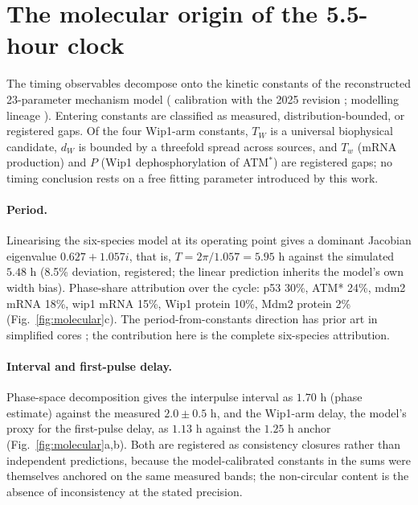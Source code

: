 \documentclass[11pt,a4paper]{article}
\begin{document}
\section{The molecular origin of the 5.5-hour clock}
\label{sec:molecular}

The timing observables decompose onto the kinetic constants of the reconstructed 23-parameter mechanism model (\cite{Monke2017} calibration with the 2025 revision \cite{Venkatachalapathy2025}; modelling lineage \cite{Monk2003,BarOr2000,Ciliberto2005,Chickarmane2007,NovakTyson2008}). Entering constants are classified as measured, distribution-bounded, or registered gaps. Of the four Wip1-arm constants, $T_W$ is a universal biophysical candidate, $d_W$ is bounded by a threefold spread across sources, and $T_w$ (mRNA production) and $P$ (Wip1 dephosphorylation of ATM$^*$) are registered gaps; no timing conclusion rests on a free fitting parameter introduced by this work.

\paragraph{Period.} Linearising the six-species model at its operating point gives a dominant Jacobian eigenvalue $0.627+1.057i$, that is, $T=2\pi/1.057=5.95$ h against the simulated $5.48$ h (8.5\% deviation, registered; the linear prediction inherits the model's own width bias). Phase-share attribution over the cycle: p53 30\%, ATM* 24\%, mdm2 mRNA 18\%, wip1 mRNA 15\%, Wip1 protein 10\%, Mdm2 protein 2\% (Fig.~\ref{fig:molecular}c). The period-from-constants direction has prior art in simplified cores \cite{Monk2003,Wang2019,Belgacem2026}; the contribution here is the complete six-species attribution.

\paragraph{Interval and first-pulse delay.} Phase-space decomposition gives the interpulse interval as $1.70$ h (phase estimate) against the measured $2.0\pm0.5$ h, and the Wip1-arm delay, the model's proxy for the first-pulse delay, as $1.13$ h against the $1.25$ h anchor (Fig.~\ref{fig:molecular}a,b). Both are registered as consistency closures rather than independent predictions, because the model-calibrated constants in the sums were themselves anchored on the same measured bands; the non-circular content is the absence of inconsistency at the stated precision.
\end{document}
